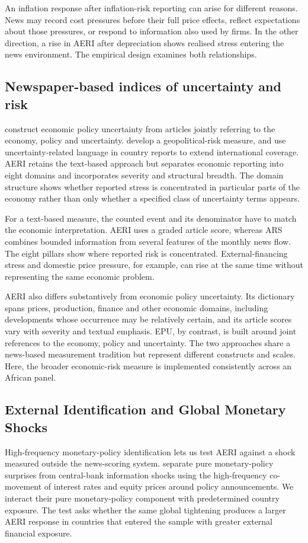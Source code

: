 \documentclass[12pt]{article}
\begin{document}
An inflation response after inflation-risk reporting can arise for different reasons. News may record cost pressures before their full price effects, reflect expectations about those pressures, or respond to information also used by firms. In the other direction, a rise in AERI after depreciation shows realised stress entering the news environment. The empirical design examines both relationships.
\subsection{Newspaper-based indices of uncertainty and risk}
\citet{baker2016} construct economic policy uncertainty from articles jointly referring to the economy, policy and uncertainty. \citet{caldara2022} develop a geopolitical-risk measure, and \citet{ahir2022} use uncertainty-related language in country reports to extend international coverage. AERI retains the text-based approach but separates economic reporting into eight domains and incorporates severity and structural breadth. The domain structure shows whether reported stress is concentrated in particular parts of the economy rather than only whether a specified class of uncertainty terms appears.

For a text-based measure, the counted event and its denominator have to match the economic interpretation. AERI uses a graded article score, whereas ARS combines bounded information from several features of the monthly news flow. The eight pillars show where reported risk is concentrated. External-financing stress and domestic price pressure, for example, can rise at the same time without representing the same economic problem.

AERI also differs substantively from economic policy uncertainty. Its dictionary spans prices, production, finance and other economic domains, including developments whose occurrence may be relatively certain, and its article scores vary with severity and textual emphasis. EPU, by contrast, is built around joint references to the economy, policy and uncertainty. The two approaches share a news-based measurement tradition but represent different constructs and scales. Here, the broader economic-risk measure is implemented consistently across an African panel.
\subsection{External Identification and Global Monetary Shocks}\label{sec:literature_external_id}
High-frequency monetary-policy identification lets us test AERI against a shock measured outside the news-scoring system. \citet{jarocinski2020} separate pure monetary-policy surprises from central-bank information shocks using the high-frequency co-movement of interest rates and equity prices around policy announcements. We interact their pure monetary-policy component with predetermined country exposure. The test asks whether the same global tightening produces a larger AERI response in countries that entered the sample with greater external financial exposure.
\end{document}
